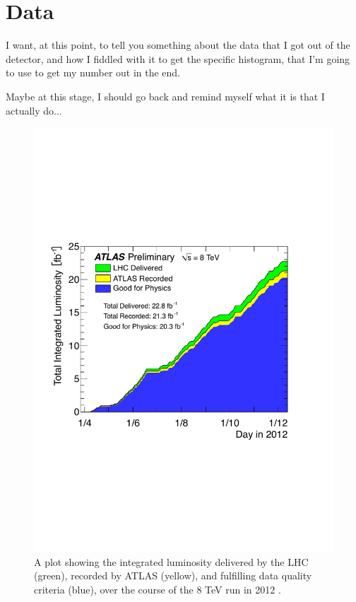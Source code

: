 \chapter{Data}

I want, at this point, to tell you something about the data that I got out of the detector, and how I fiddled with it to get the specific histogram, that I'm going to use to get my number out in the end.

Maybe at this stage, I should go back and remind myself what it is that I actually do...

\begin{figure}[htp]
\begin{minipage}[b]{.69\textwidth}
\hspace{-1em}\includegraphics[width=\textwidth]{figures/intlumi}
\end{minipage}\hfill\begin{minipage}[b]{.3\textwidth}
\caption{A plot showing the integrated luminosity delivered by the LHC (green), recorded by ATLAS (yellow), and fulfilling data quality criteria (blue), over the course of the 8 TeV run in 2012 \cite{publiclumi}.
\label{intlumi}}
\end{minipage}
\end{figure}


